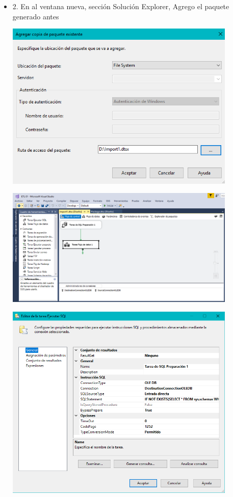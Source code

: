 \begin{itemize}
\item 2. En al ventana nueva, sección Solución Explorer, Agrego el paquete generado antes\\
	\begin{center}
	\includegraphics[width=11cm]{./Imagenes/img14}
	\end{center}	
	\begin{center}
	\includegraphics[width=11cm]{./Imagenes/img15}
	\end{center}	
	\begin{center}
	\includegraphics[width=11cm]{./Imagenes/img16}
	\end{center}	


\end{itemize}
